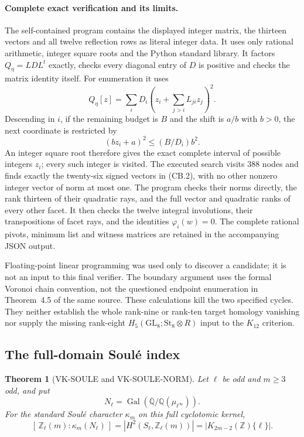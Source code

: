\documentclass[11pt,a4paper]{article}
\newtheorem{theorem}{Theorem}[section]
\theoremstyle{definition}
\begin{document}
\paragraph{Complete exact verification and its limits.}
The self-contained program
 contains the displayed
integer matrix, the thirteen vectors and all twelve reflection
rows as literal integer data. It uses only rational arithmetic,
integer square roots and the Python standard library.
It factors $Q_\eta=L D L^t$ exactly, checks every diagonal entry
of $D$ is positive and checks the matrix identity itself.
For enumeration it uses
\[
 Q_\eta[z]=\sum_i D_i
       \left(z_i+\sum_{j>i}L_{ji}z_j\right)^2.
\]
Descending in $i$, if the remaining budget is $B$ and the shift
is $a/b$ with $b>0$, the next coordinate is restricted by
\[
 (b z_i+a)^2\le (B/D_i)b^2.
\]
An integer square root therefore gives the exact complete
interval of possible integers $z_i$; every such integer is
visited. The executed search visits $388$ nodes and finds
exactly the twenty-six signed vectors in (CB.2), with no
other nonzero integer vector of norm at most one.
The program checks their norms directly, the rank thirteen of
their quadratic rays, and the full vector and quadratic ranks
of every other facet. It then checks the twelve integral
involutions, their transpositions of facet rays, and the
identities $\varphi_i(w)=0$. The complete rational pivots,
minimum list and witness matrices are retained in the
accompanying JSON output.

Floating-point linear programming was used only to discover a
candidate; it is not an input to this final verifier. The boundary
argument uses the formal Voronoi chain convention, not the
questioned endpoint enumeration in Theorem~4.5 of the same
source. These calculations kill the two specified cycles.
They neither establish the whole rank-nine or rank-ten target
homology vanishing nor supply the missing rank-eight
$H_5(\mathrm{GL}_8;\mathrm{St}_8\otimes R)$ input to the
$K_{12}$ criterion.

\subsection{The full-domain Soul\'e index}

\begin{theorem}[VK-SOULE and VK-SOULE-NORM]
Let \(\ell\) be odd and \(m\ge3\) odd, and put
\[
 N_\ell=\operatorname{Gal}
   (\overline{\mathbb Q}/\mathbb Q(\mu_{\ell^\infty})).
\]
For the standard Soul\'e character \(\kappa_m\) on this
full cyclotomic kernel,
\[
 [\,\mathbb Z_\ell(m):\kappa_m(N_\ell)\,]
   =|H^2(S_\ell,\mathbb Z_\ell(m))|
   =|K_{2m-2}(\mathbb Z)\{\ell\}|.                   \tag{K18}
\]
\end{theorem}
\end{document}
